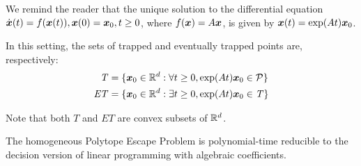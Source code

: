 We remind the reader that the unique solution to the differential equation $\dot{\boldsymbol{x}}(t)=f(\boldsymbol{x}(t)),\boldsymbol{x}(0)=\boldsymbol{x}_{0},t\geq 0$, where $f(\boldsymbol{x})=A\boldsymbol{x}$, is given by
$\boldsymbol{x}(t)=\exp(At)\boldsymbol{x}_{0}$.

In this setting, the sets of trapped and eventually trapped points are, respectively:
\begin{align*}
\mathit{T}&=\lbrace \boldsymbol{x}_0\in\mathbb{R}^{d}: \forall t\geq 0, \exp(At)\boldsymbol{x}_{0} \in \mathcal{P}\rbrace \\
\mathit{ET}&=\lbrace\boldsymbol{x}_{0}\in\mathbb{R}^{d}:\exists t\geq 0,\exp(At)\boldsymbol{x}_{0}\in\mathit{T}\rbrace
\end{align*}

Note that both $\mathit{T}$ and $\mathit{ET}$ are convex subsets of $\mathbb{R}^{d}$.

\begin{lemma}
  The homogeneous Polytope Escape Problem is polynomial-time
  reducible to the decision version of linear programming with
  algebraic coefficients.
\end{lemma}

